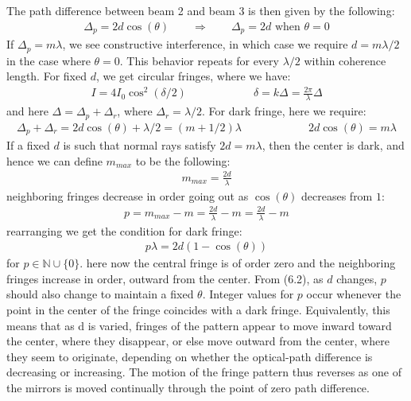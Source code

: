 \documentclass[11pt]{book}
\theoremstyle{break}
\theoremstyle{break}
\newcommand{\N}{\mathbb{N}}
\begin{document}
The path difference between beam 2 and beam 3 is then given by the following:
\begin{align*}
\Delta_p = 2d\cos(\theta) \qquad \Rightarrow \qquad \Delta_p = 2d \text{ when }\theta = 0
\end{align*}
If $\Delta_p = m\lambda$, we see constructive interference, in which case we require $d = m \lambda /2$ in the case where $\theta = 0$. This behavior repeats for every $\lambda/2$ within coherence length. For fixed $d$, we get circular fringes, where we have:
\begin{align*}
I = 4I_0 \cos^2(\delta/2) \qquad \qquad \qquad \delta = k\Delta = \frac{2\pi}{\lambda}\Delta
\end{align*}
and here $\Delta = \Delta_p + \Delta_r$, where $\Delta_r = \lambda/2$. For dark fringe, here we require: 
\begin{align}
\Delta_p +\Delta_r = 2d\cos(\theta)+\lambda/2 = (m+1/2)\lambda \qquad \qquad \qquad 2d\cos(\theta) = m\lambda
\end{align}
If a fixed $d$ is such that normal rays satisfy $2d = m\lambda$, then the center is dark, and hence we can define $m_{max}$ to be the following:
\begin{align*}
m_{max} = \frac{2d}{\lambda}
\end{align*}
neighboring fringes decrease in order going out as $\cos(\theta)$ decreases from $1$:
\begin{align*}
p = m_{max} - m = \frac{2d}{\lambda} - m = \frac{2d}{\lambda } -m
\end{align*}
rearranging we get the condition for dark fringe:
\begin{align}
p\lambda = 2d(1-\cos(\theta))
\end{align}
for $p \in \N\cup\{0\}$. here now the central fringe is of order zero and the neighboring fringes increase in order, outward from the center. From (6.2), as $d$ changes, $p$ should also change to maintain a fixed $\theta$. Integer values for $p$ occur whenever the point in the center of the fringe coincides with a dark fringe. Equivalently, this means that as d is varied, fringes of the pattern appear to move inward toward the center, where they disappear, or else move outward from the center, where they seem to originate, depending on whether the optical-path difference is decreasing or increasing. The motion of the fringe pattern thus reverses as one of the mirrors is moved continually through the point of zero path difference. \\
\end{document}
